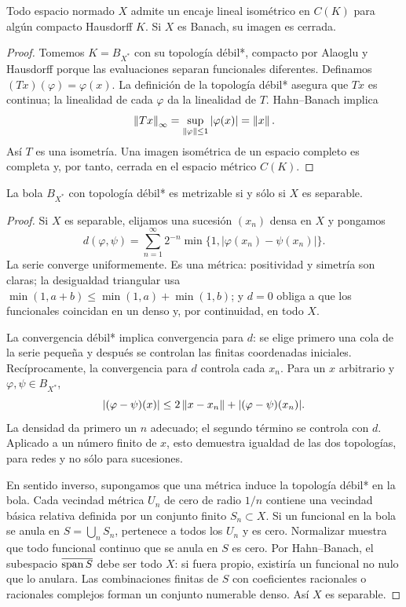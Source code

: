 \begin{teorema}\label{v3:encaje-CK}
Todo espacio normado $X$ admite un encaje lineal isométrico en $C(K)$ para algún compacto Hausdorff $K$. Si $X$ es Banach, su imagen es cerrada.
\end{teorema}
\begin{proof}
Tomemos $K=B_{X^*}$ con su topología débil*, compacto por Alaoglu y Hausdorff porque las evaluaciones separan funcionales diferentes. Definamos $(Tx)(\varphi)=\varphi(x)$. La definición de la topología débil* asegura que $Tx$ es continua; la linealidad de cada $\varphi$ da la linealidad de $T$. Hahn--Banach implica
\[
 \left\lVert Tx\right\rVert_\infty=\sup_{\left\lVert\varphi\right\rVert\leq1}|\varphi(x)|=\left\lVert x\right\rVert.
\]
Así $T$ es una isometría. Una imagen isométrica de un espacio completo es completa y, por tanto, cerrada en el espacio métrico $C(K)$.
\end{proof}

\begin{teorema}\label{v3:bola-dual-metrizable}
La bola $B_{X^*}$ con topología débil* es metrizable si y sólo si $X$ es separable.
\end{teorema}
\begin{proof}
Si $X$ es separable, elijamos una sucesión $(x_n)$ densa en $X$ y pongamos
\[
 d(\varphi,\psi)=\sum_{n=1}^{\infty}2^{-n}
          \min\{1,|\varphi(x_n)-\psi(x_n)|\}.
\]
La serie converge uniformemente. Es una métrica: positividad y simetría son claras; la desigualdad triangular usa $\min(1,a+b)\leq\min(1,a)+\min(1,b)$; y $d=0$ obliga a que los funcionales coincidan en un denso y, por continuidad, en todo $X$.

La convergencia débil* implica convergencia para $d$: se elige primero una cola de la serie pequeña y después se controlan las finitas coordenadas iniciales. Recíprocamente, la convergencia para $d$ controla cada $x_n$. Para un $x$ arbitrario y $\varphi,\psi\in B_{X^*}$,
\[
 |(\varphi-\psi)(x)|\leq2\left\lVert x-x_n\right\rVert
                 +|(\varphi-\psi)(x_n)|.
\]
La densidad da primero un $n$ adecuado; el segundo término se controla con $d$. Aplicado a un número finito de $x$, esto demuestra igualdad de las dos topologías, para redes y no sólo para sucesiones.

En sentido inverso, supongamos que una métrica induce la topología débil* en la bola. Cada vecindad métrica $U_n$ de cero de radio $1/n$ contiene una vecindad básica relativa definida por un conjunto finito $S_n\subset X$. Si un funcional en la bola se anula en $S=\bigcup_nS_n$, pertenece a todos los $U_n$ y es cero. Normalizar muestra que todo funcional continuo que se anula en $S$ es cero. Por Hahn--Banach, el subespacio $\overline{\operatorname{span} S}$ debe ser todo $X$: si fuera propio, existiría un funcional no nulo que lo anulara. Las combinaciones finitas de $S$ con coeficientes racionales o racionales complejos forman un conjunto numerable denso. Así $X$ es separable.
\end{proof}

